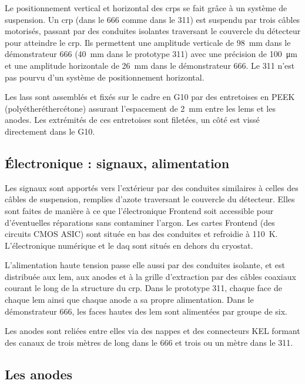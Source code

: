             Le positionnement vertical et horizontal des \glspl{crp} se fait grâce à un système de suspension. Un \gls{crp} (dans le 666 comme dans le 311) est suspendu par trois câbles motorisés, passant par des conduites isolantes traversant le couvercle du détecteur pour atteindre le \gls{crp}. Ils permettent une amplitude verticale de \SI{98}{\milli\meter} dans le démonstrateur 666 (\SI{40}{\milli\meter} dans le prototype 311) avec une précision de \SI{100}{\micro\meter} et une amplitude horizontale de \SI{26}{\milli\meter} dans le démonstrateur 666. Le 311 n'est pas pourvu d'un système de positionnement horizontal.
            
            Les \glspl{las} sont assemblés et fixés sur le cadre en G10 par des entretoises en PEEK (polyétheréthercétone) assurant l'espacement de \SI{2}{\milli\meter} entre les \glspl{lem} et les anodes. Les extrémités de ces entretoises sont filetées, un côté est vissé directement dans le G10.
            
        \subsection{Électronique : signaux, alimentation}
            
            Les signaux sont apportés vers l'extérieur par des conduites similaires à celles des câbles de suspension, remplies d'azote \cite{Acciarri2016a} traversant le couvercle du détecteur. Elles sont faites de manière à ce que l'électronique Frontend soit accessible pour d'éventuelles réparations sans contaminer l'argon. Les cartes Frontend (des circuits CMOS ASIC) sont située en bas des conduites et refroidie à \SI{110}{\kelvin}. L'électronique numérique et le \gls{daq} sont situés en dehors du cryostat.
            
            L'alimentation haute tension passe elle aussi par des conduites isolante, et est distribuée aux \gls{lem}, aux anodes et à la grille d'extraction par des câbles coaxiaux courant le long de la structure du \gls{crp}. Dans le prototype 311, chaque face de chaque \gls{lem} ainsi que chaque anode a sa propre alimentation. Dans le démonstrateur 666, les faces hautes des \gls{lem} sont alimentées par groupe de six.
            
            Les anodes sont reliées entre elles via des nappes et des connecteurs KEL formant des canaux de trois mètres de long dans le 666 et trois ou un mètre dans le 311.
            
        \subsection{Les anodes}\label{sec::anode}
        
